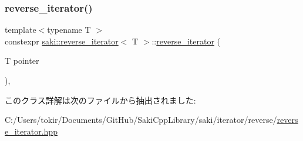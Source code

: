 \subsubsection{\texorpdfstring{reverse\+\_\+iterator()}{reverse\_iterator()}}
{\footnotesize\ttfamily template$<$typename T $>$ \\
constexpr \mbox{\hyperlink{classsaki_1_1reverse__iterator}{saki\+::reverse\+\_\+iterator}}$<$ T $>$\+::\mbox{\hyperlink{classsaki_1_1reverse__iterator}{reverse\+\_\+iterator}} (\begin{DoxyParamCaption}\item[{T}]{pointer }\end{DoxyParamCaption})\hspace{0.3cm}{\ttfamily [inline]}, {\ttfamily [explicit]}}



このクラス詳解は次のファイルから抽出されました\+:\begin{DoxyCompactItemize}
\item 
C\+:/\+Users/tokir/\+Documents/\+Git\+Hub/\+Saki\+Cpp\+Library/saki/iterator/reverse/\mbox{\hyperlink{reverse__iterator_8hpp}{reverse\+\_\+iterator.\+hpp}}\end{DoxyCompactItemize}

